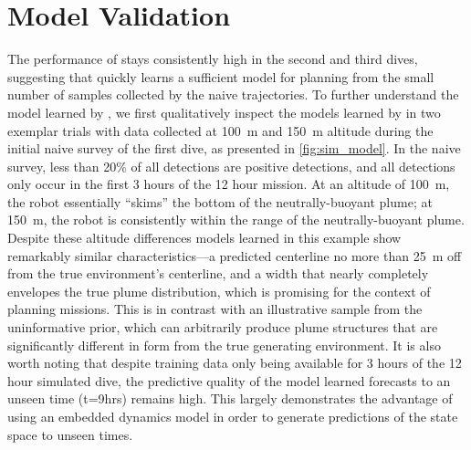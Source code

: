 \section{\PHUMES Model Validation}
\label{sec:phumes_perform}
The performance of \PHORTEX stays consistently high in the second and third dives, suggesting that \PHUMES quickly learns a sufficient model for planning from the small number of samples collected by the naive trajectories. To further understand the model learned by \PHUMES, we first qualitatively inspect the models learned by \PHUMES in two exemplar trials with data collected at \SI{100}{\meter} and \SI{150}{\meter} altitude during the initial naive survey of the first dive, as presented in \cref{fig:sim_model}. In the naive survey, less than 20\% of all detections are positive detections, and all detections only occur in the first 3 hours of the 12 hour mission. At an altitude of \SI{100}{\meter}, the robot essentially ``skims'' the bottom of the neutrally-buoyant plume; at \SI{150}{\meter}, the robot is consistently within the range of the neutrally-buoyant plume. Despite these altitude differences models learned in this example show remarkably similar characteristics---a predicted centerline no more than \SI{25}{\meter} off from the true environment's centerline, and a width that nearly completely envelopes the true plume distribution, which is promising for the context of planning missions. This is in contrast with an illustrative sample from the uninformative prior, which can arbitrarily produce plume structures that are significantly different in form from the true generating environment. It is also worth noting that despite training data only being available for 3 hours of the 12 hour simulated dive, the predictive quality of the model learned forecasts to an unseen time (t=9hrs) remains high. This largely demonstrates the advantage of using an embedded dynamics model in order to generate predictions of the state space to unseen times.

